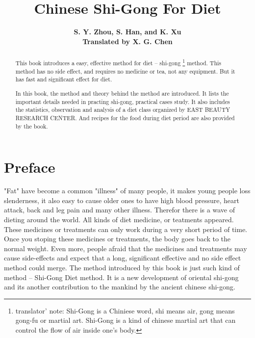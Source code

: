 


\textheight 9.0in
\textwidth 6.30in
\voffset -0.85in
\hoffset -0.60in
\def\R{{\bf R}}
\def\j{{\rm j}}
\def\C{{\bf C}}


\title{\bf Chinese Shi-Gong For Diet }

\author{\bf S. Y. Zhou, S. Han, and K. Xu \\
        Translated by X. G. Chen}

\maketitle

\begin{abstract}
This book introduces a easy, effective method for diet -- shi-gong \footnote{ translator' note: 
Shi-Gong is a Chiniese word, shi means air, gong means gong-fu or martial art. Shi-Gong is a kind
of chinese martial art that can control the flow of air inside one's body.} method.
This method has no side effect,
and requires no medicine or tea, not any equipment. But it has fast and significant effect for diet.

In this book, the method and theory behind the method are introduced. It lists the important details
needed in practing shi-gong, practical cases study. It also includes the statistics, observation and
analysis of a diet class organized by EAST BEAUTY RESEARCH CENTER. And recipes for the food during
diet period are also provided by the book.  
\end{abstract}

\tableofcontents

\chapter{Preface}

"Fat" have become a common "illness" of many people, it makes young people loss slenderness,
it also easy to cause older ones to have high blood pressure, heart attack, back and leg pain and
many other illness. Therefor there is a wave of dieting around the world. All kinds of diet medicine,
or teatments appeared. These medicines or treatments can only work during a very short period of time. Once
you stoping these medicines or treatments, the body goes back to the normal weight. Even more, people afraid
that the medicines and treatments may cause side-effects and expect that a long, significant effective and no
side effect method could merge. The method introduced by this book is just such kind of method -- Shi-Gong Diet
method. It is a new development of oriental shi-gong and its another contribution to the mankind by the
ancient chinese shi-gong.  
\vspace{0.1 in}

